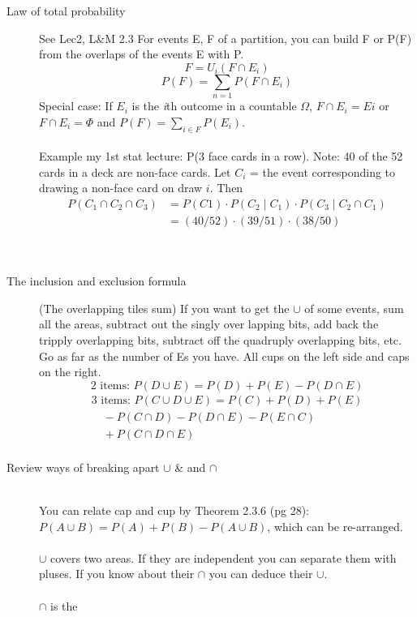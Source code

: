 \begin{description}
\item[Law of total probability] See Lec2, L\&M 2.3 \newline
For events E, F of a partition, you can build F or P(F) from the overlaps of the events E with P.
	\[ F = U_i(F \cap E_i)  \]
	\[ P(F) = \sum_{n=1} P(F \cap E_i) \]
Special case: If $E_i$ is the \textit{i}th outcome in a countable $\Omega$, $F \cap E_i = Ei$ 
or $F \cap E_i = \Phi$ and $P(F) = \sum_{i \in F} P(E_i)$.  \hfill \\
\hfill \\
Example {\tiny my 1st stat lecture}:  P(3 face cards in a row).  Note: 40 of the 52 cards in a deck are non-face cards.  Let $C_i$ = the event corresponding to drawing a non-face card on draw $i$.  Then 
	\begin{align*}
		P(C_1 \cap C_2 \cap C_3) &= P(C1)  \cdot P(C_2 \mid C_1) \cdot P(C_3 \mid C_2 \cap C_1) \\
			&= (40/52) \cdot (39/51) \cdot (38/50) 
	\end{align*} 
	\hfill \\
  \hfill \\


\item[The inclusion and exclusion formula] (The overlapping tiles sum)
If you want to get the $\cup$ of some events, sum all the areas, subtract out the singly over lapping bits, add back the tripply overlapping bits, subtract off the quadruply overlapping bits, etc.  Go as far as the number of Es you have. 
All cups on the left side and caps on the right. 
	\[\mbox{2 items: } P(D \cup E) = P(D) + P(E) - P(D \cap E) \]
	\begin{align*}
	\mbox{3 items: }   
	P(C \cup D \cup E) = P(C) + P(D) + P(E) \\
	\quad - P(C \cap D) - P(D \cap E) - P(E \cap C) \\
	\quad + P(C \cap D \cap E) \\
	\end{align*}

\item[Review ways of breaking apart $\cup$ \& and $\cap$] \hfill \\

 You can relate cap and cup {\tiny by Theorem 2.3.6 (pg 28)}:
$P(A \cup B) = P(A) + P(B) - P(A \cup B)$, which can be re-arranged.  \hfill \\
\hfill \\
$\cup$ covers two areas.  If they are independent you can separate them with pluses.  If you know about their $\cap$ you can deduce their $\cup$.  \hfill \\
\hfill \\
$\cap$ is the

\end{description}

